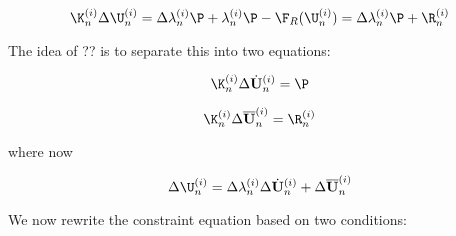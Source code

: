 $$
\K_n^{(i)} \Delta \U_n^{(i)} = \Delta \lambda_n^{(i)} \P +
\lambda_n^{(i)} \P - \F_R(\U_n^{(i)}) = \Delta \lambda_n^{(i)} \P + \R_n^{(i)}
$$


\noindent The idea of ?? is to separate this into two equations:

\def\Uh{\dot{\bf U}}
\def\Ub{\overline{\bf U}}

$$
\K_n^{(i)} \Delta \Uh_n^{(i)} = \P
$$


$$
\K_n^{(i)} \Delta \Ub_n^{(i)} = \R_n^{(i)}
$$


\noindent where now

\begin{equation}
 \Delta \U_n^{(i)} = \Delta \lambda_n^{(i)} \Delta \Uh_n^{(i)} + \Delta \Ub_n^{(i)}  
\label{splitForm}
\end{equation}

\noindent We now rewrite the constraint equation based on two conditions:

